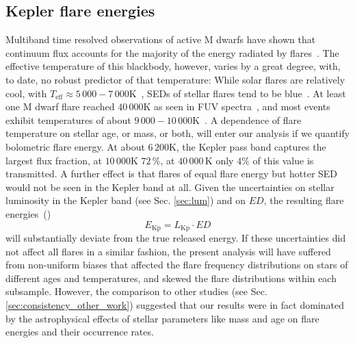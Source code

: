 \documentclass{aa}
\begin{document}
\subsection{Kepler flare energies}
Multiband time resolved observations of active M dwarfs have shown that continuum flux accounts for the majority  of the energy radiated by flares~\citep{kowalski_time-resolved_2013}. %
The effective temperature of this blackbody, however, varies by a great degree, with, to date, no robust predictor of that temperature:
While solar flares are relatively cool, with \mbox{$T_\mathrm{eff}\approx5\,000-7\,000 $\;K}~\citep{kleint_solarstellarwlf_2016, kerr_solarstellarwlf_2014, watanabe_solarstellarwlf_2013, namekata_solarstellarwlf_2017}, SEDs of stellar flares tend to be blue~\citep{davenport_multi-wavelength_2012}. At least one M dwarf flare reached $40\,000$\;K as seen in FUV spectra~\citep{froning_40000_2019}, and most events exhibit temperatures of about $9\,000-10\,000$\;K~\citep{1992ApJS...78..565H, kretzschmar_sun_2011, shibayama2013}. 
A dependence of flare temperature on stellar age, or mass, or both, will enter our analysis if we quantify bolometric flare energy. At about $6\,200$\;K, the Kepler pass band captures the largest flux fraction, at $10\,000$\;K $72\,\%$, at $40\,000$\,K only $4\%$ of this value is transmitted. A further effect is that flares of equal flare energy but hotter SED would not be seen in the Kepler band at all. Given the uncertainties on stellar luminosity in the Kepler band (see Sec. \ref{sec:lum}) and on $ED$, the resulting flare energies~()
\begin{equation}
E_\mathrm{Kp} = L_\mathrm{Kp} \cdot ED
\end{equation}  
will substantially deviate from the true released energy. If these uncertainties did not affect all flares in a similar fashion, the present analysis will have suffered from non-uniform biases that affected the flare frequency distributions on stars of different ages and temperatures, and skewed the flare distributions within each subsample. However, the comparison to other studies (see Sec. \ref{sec:consistency_other_work}) suggested that our results were in fact dominated by the astrophysical effects of stellar parameters like mass and age on flare energies and their occurrence rates.  
\end{document}
